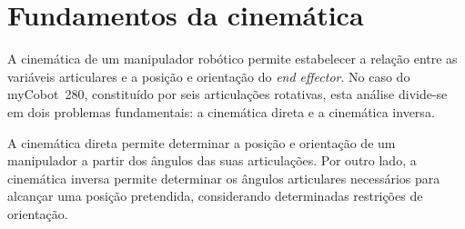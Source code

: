 
\section{Fundamentos da cinemática}
\label{sec:fundamentos}

A cinemática de um manipulador robótico permite estabelecer a relação entre as variáveis articulares e a posição e orientação do \textit{end effector}. No caso do myCobot~280, constituído por seis articulações rotativas, esta análise divide-se em dois problemas fundamentais: a cinemática direta e a cinemática inversa.

A cinemática direta permite determinar a posição e orientação de um manipulador a partir dos ângulos das suas articulações. Por outro lado, a cinemática inversa permite determinar os ângulos articulares necessários para alcançar uma posição pretendida, considerando determinadas restrições de orientação.

